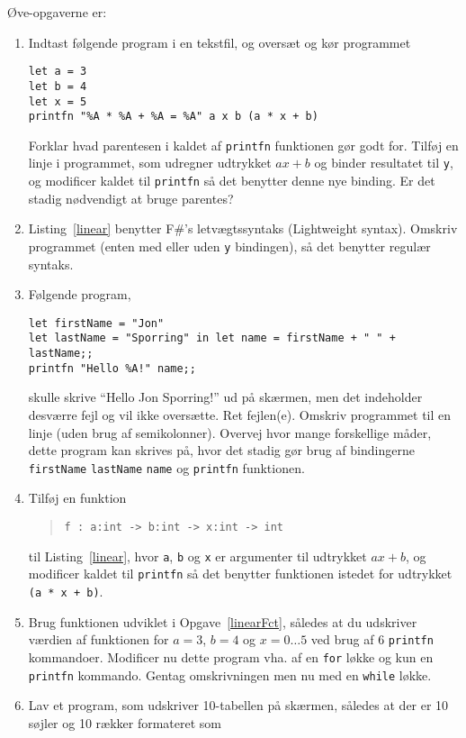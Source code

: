 \documentclass[a4paper,12pt]{article}
\begin{document}
Øve-opgaverne er:
\begin{enumerate}[label=3ø.\arabic*,start=0]
\item Indtast følgende program i en tekstfil, og oversæt og kør programmet 
\begin{lstlisting}[caption=Expression for a line,label=linear]
let a = 3
let b = 4
let x = 5
printfn "%A * %A + %A = %A" a x b (a * x + b)
\end{lstlisting}
Forklar hvad parentesen i kaldet af \lstinline!printfn! funktionen gør godt for. Tilføj en linje i programmet, som udregner udtrykket $ax+b$ og binder resultatet til \lstinline!y!, og modificer kaldet til \lstinline!printfn! så det benytter denne nye binding. Er det stadig nødvendigt at bruge parentes?
\item Listing~\ref{linear} benytter F\#'s letvægtssyntaks (Lightweight syntax). Omskriv programmet (enten med eller uden \lstinline!y! bindingen), så det benytter regulær syntaks.
\item Følgende program,
\begin{lstlisting}
let firstName = "Jon"
let lastName = "Sporring" in let name = firstName + " " + lastName;;
printfn "Hello %A!" name;;
\end{lstlisting}
skulle skrive "`Hello Jon Sporring!"' ud på skærmen, men det indeholder desværre fejl og vil ikke oversætte. Ret fejlen(e). Omskriv programmet til en linje (uden brug af semikolonner). Overvej hvor mange forskellige måder, dette program kan skrives på, hvor det stadig gør brug af bindingerne \lstinline!firstName! \lstinline!lastName! \lstinline!name! og \lstinline!printfn! funktionen. 
\item \label{linearFct} Tilføj en funktion
  \begin{quote}
    \mbox{\lstinline!f : a:int -> b:int -> x:int -> int!}
  \end{quote}
til Listing~\ref{linear}, hvor \lstinline!a!, \lstinline!b! og \lstinline!x! er argumenter til udtrykket $ax+b$, og modificer kaldet til \lstinline!printfn! så det benytter funktionen istedet for udtrykket \lstinline!(a * x + b)!.
\item \label{table} Brug funktionen udviklet i Opgave~\ref{linearFct}, således at du udskriver værdien af funktionen for $a=3$, $b=4$ og $x=0\ldots5$ ved brug af 6 \lstinline!printfn! kommandoer. Modificer nu dette program vha. af en \lstinline!for! løkke og kun en \lstinline!printfn! kommando. Gentag omskrivningen men nu med en \lstinline!while! løkke.
\item \label{multiplicationTable} Lav et program, som udskriver 10-tabellen på skærmen, således at der er 10 søjler og 10 rækker formateret som

\end{enumerate}
\end{document}
